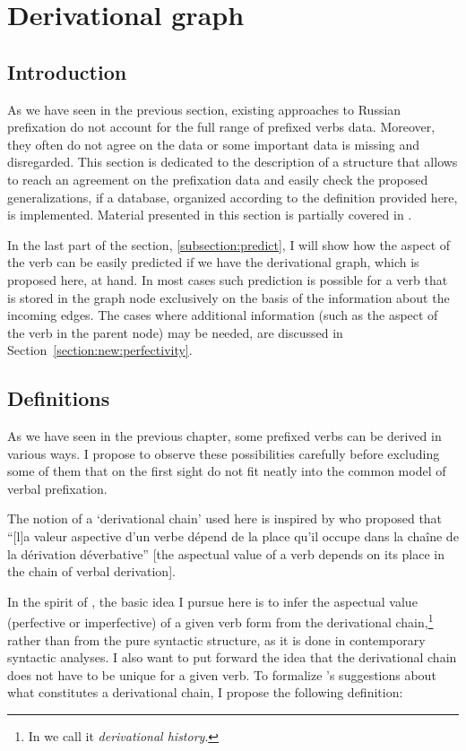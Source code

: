 
\section{Derivational graph}\label{section:graph}
\subsection{Introduction}
As we have seen in the previous section, existing approaches to Russian prefixation do not account for the full range of prefixed verbs data. Moreover, they often do not agree on the data or some important data is missing and disregarded. This section is dedicated to the description of a structure that allows to reach an agreement on the prefixation data and easily check the proposed generalizations, if a database, organized according to the definition provided here, is implemented. Material presented in this section is partially covered in \citet{ZinovaFilip:14b}.

In the last part of the section, \ref{subsection:predict}, I will show how the aspect of the verb can be easily predicted if we have the derivational graph, which is proposed here, at hand. In most cases such prediction is possible for a verb that is stored in the graph node exclusively on the basis of the information about the incoming edges. The cases where additional information (such as the aspect of the verb in the parent node) may be needed, are discussed in Section~\ref{section:new:perfectivity}.

\subsection{Definitions}\label{section:chains:definition}
As we have seen in the previous chapter, some prefixed verbs can be derived in various ways. I propose to observe these possibilities carefully before excluding some of them that on the first sight do not fit neatly into the common model of verbal prefixation.

The notion of a `derivational chain' used here is inspired by \citet{Karcevski:27} who proposed that ``[l]a valeur aspective d'un verbe d\'{e}pend de la place qu'il occupe dans la cha\^{i}ne de la d\'{e}rivation d\'{e}verbative'' [the aspectual value of a verb depends on its place in the chain of verbal derivation].

In the spirit of \citet{Karcevski:27}, the basic idea I pursue here is to infer the aspectual value (perfective or imperfective) of a given verb form from the derivational chain,\footnote{In \citet{ZinovaFilip:14b} we call it \textit{derivational history}.} rather than from the pure syntactic structure, as it is done in contemporary syntactic analyses. I also want to put forward the idea that the derivational chain does not have to be unique for a given verb. To formalize \citeauthor{Karcevski:27}'s \citeyear{Karcevski:27} suggestions about what constitutes a derivational chain, I propose the following definition:

